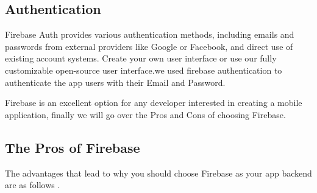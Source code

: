\subsection{Authentication}
Firebase Auth provides various authentication methods, including emails and passwords from external providers like Google or Facebook, and direct use of existing account systems. Create your own user interface or use our fully customizable open-source user interface.we used firebase authentication to authenticate the app users with their Email and Password.

Firebase is an excellent option for any developer interested in creating a mobile application, finally we will go over the Pros and Cons of choosing Firebase.

\subsection{The Pros of Firebase}
The advantages that lead to why you should choose Firebase as your app backend are as follows \cite{firebaseprosandcons:online}. 
